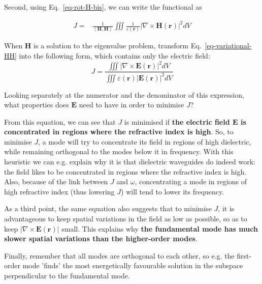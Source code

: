 Second, using Eq.~\ref{eq-rot-H-bis}, we can write the functional as

\begin{align}
J =& \frac{1}{\left\langle {\mathbf H} , {\mathbf H}\right\rangle}  \iiint \frac{1}{\varepsilon({\mathbf r})} \left | \nabla \times {\mathbf H({\mathbf r})} \right |^2  dV  \label{eq-variational-HH}
\end{align} 

\pagebreak

\begin{exer}
When ${\mathbf H}$ is a solution to the eigenvalue problem, transform Eq.~\ref{eq-variational-HH} into the following form, which contains only the electric field:
$$J=\frac{\iiint \left | \nabla \times {\mathbf E({\mathbf r})} \right |^2  dV} {\iiint \varepsilon({\mathbf r}) \left | {\mathbf E({\mathbf r})} \right |^2  dV} $$
\label{ex-eigenvalue-e}
\end{exer}

\begin{cue}
Looking separately at the numerator and the denominator of this expression, what properties does ${\mathbf E}$ need to have in order to minimise $J$?   
\end{cue}

From this equation, we can see that $J$ is minimised if \textbf{the electric field ${\mathbf E}$ is concentrated in regions where the refractive index is high}. So, to minimise $J$, a mode will try to concentrate its field in regions of high dielectric, while remaining orthogonal to the modes below it in frequency. With this heuristic we can e.g. explain why it is that dielectric waveguides do indeed work: the field likes to be concentrated in regions where the refractive index is high. Also, because of the link between $J$ and $\omega$, concentrating a mode in regions of high refractive index (thus lowering $J$) will tend to lower its frequency.

As a third point, the same equation also suggests that to minimise $J$, it is advantageous to keep spatial variations in the field as low as possible, so as to keep  $\left| \nabla \times {\mathbf E({\mathbf r})} \right |$ small. This explains why \textbf{the fundamental mode has much slower spatial variations than the higher-order modes}.

Finally, remember that all modes are orthogonal to each other, so e.g. the first-order mode 'finds' the most energetically favourable solution in the subspace perpendicular to the fundamental mode.

